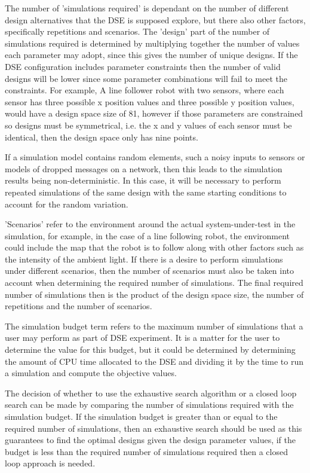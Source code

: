 The number of 'simulations required' is dependant on the number of different design alternatives that the DSE is supposed explore, but there also other factors, specifically repetitions and scenarios.  The 'design' part of the number of simulations required is determined by multiplying together the number of values each parameter may adopt, since this gives the number of unique designs.  If the DSE configuration includes parameter constraints then the number of valid designs will be lower since some parameter combinations will fail to meet the constraints.  For example, A line follower robot with two sensors, where each sensor has three possible x position values and three possible y position values, would have a design space size of 81, however if those parameters are constrained so designs must be symmetrical, i.e. the x and y values of each sensor must be identical, then the design space only has nine points.  

If a simulation model contains random elements, such a noisy inputs to sensors or models of dropped messages on a network, then this leads to the simulation results being non-deterministic.  In this case, it will be necessary to perform repeated simulations of the same design with the same starting conditions to account for the random variation.  

'Scenarios' refer to the environment around the actual system-under-test in the simulation, for example, in the case of a line following robot, the environment could include the map that the robot is to follow along with other factors such as the intensity of the ambient light.  If there is a desire to perform simulations under different scenarios, then the number of scenarios must also be taken into account when determining the required number of simulations.  The final required number of simulations then is the product of the design space size, the number of repetitions and the number of scenarios.

The simulation budget term refers to the maximum number of simulations that a user may perform as part of DSE experiment.  It is a matter for the user to determine the value for this budget, but it could be determined by determining the amount of CPU time allocated to the DSE and dividing it by the time to run a simulation and compute the objective values.


The decision of whether to use the exhaustive search algorithm or a closed loop search can be made by comparing the number of simulations required with the simulation budget.  If the simulation budget is greater than or equal to the required number of simulations, then an exhaustive search should be used as this guarantees to find the optimal designs given the design parameter values, if the budget is less than the required number of simulations required then a closed loop approach is needed.

